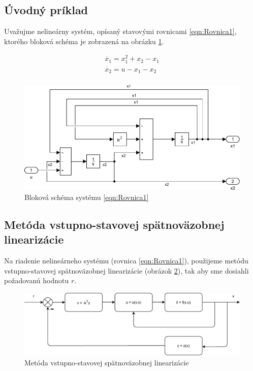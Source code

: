 \documentclass[../main.tex]{subfiles}
\begin{document}
	
\subsection{Úvodný príklad}
Uvažujme nelineárny systém, opísaný stavovými rovnicami \ref{eqn:Rovnica1}, ktorého bloková schéma je zobrazená na obrázku \ref{fig:BlokovaSchemaPr1}. 

\begin{equation}
	\begin{gathered}
	\dot{x_1}  = x_1^2 + x_2 - x_1 \\
	\dot{x_2} = u - x_1 - x_2 \\
	\end{gathered}
	\label{eqn:Rovnica1}
\end{equation}
	
\begin{figure}[H]
	\begin{center}\includegraphics[scale=0.8]{Rovnica1.pdf}\end{center}
	\caption{Bloková schéma systému \ref{eqn:Rovnica1}}
	\label{fig:BlokovaSchemaPr1}
\end{figure}
	
\subsection{Metóda vstupno-stavovej spätnoväzobnej linearizácie}

Na riadenie nelineárneho systému (rovnica \ref{eqn:Rovnica1}), použijeme metódu vstupno-stavovej spätnoväzobnej linearizácie (obrázok \ref{fig:MetodaVS}), tak aby sme dosiahli požadovanú hodnotu $r$.

\begin{figure}[H]
	\begin{center}\includegraphics[scale=0.8]{MVSlin.pdf}\end{center}
	\caption{Metóda vstupno-stavovej spätnoväzobnej linearizácie}
	\label{fig:MetodaVS}
\end{figure}
\end{document}
